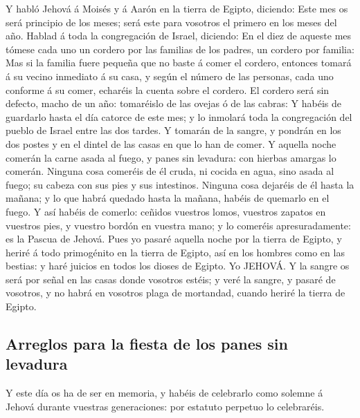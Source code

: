  Y habló Jehová á Moisés y á Aarón en la tierra de Egipto,
diciendo:  Este mes os será principio de los meses; será
este para vosotros el primero en los meses del año.  Hablad
á toda la congregación de Israel, diciendo: En el diez de aqueste mes
tómese cada uno un cordero por las familias de los padres, un cordero
por familia:  Mas si la familia fuere pequeña que no baste á
comer el cordero, entonces tomará á su vecino inmediato á su casa, y
según el número de las personas, cada uno conforme á su comer, echaréis
la cuenta sobre el cordero.  El cordero será sin defecto,
macho de un año: tomaréislo de las ovejas ó de las cabras: 
Y habéis de guardarlo hasta el día catorce de este mes; y lo inmolará
toda la congregación del pueblo de Israel entre las dos tardes.
 Y tomarán de la sangre, y pondrán en los dos postes y en el
dintel de las casas en que lo han de comer.  Y aquella noche
comerán la carne asada al fuego, y panes sin levadura: con hierbas
amargas lo comerán.  Ninguna cosa comeréis de él cruda, ni
cocida en agua, sino asada al fuego; su cabeza con sus pies y sus
intestinos.  Ninguna cosa dejaréis de él hasta la mañana; y
lo que habrá quedado hasta la mañana, habéis de quemarlo en el fuego.
 Y así habéis de comerlo: ceñidos vuestros lomos, vuestros
zapatos en vuestros pies, y vuestro bordón en vuestra mano; y lo
comeréis apresuradamente: es la Pascua de Jehová.  Pues yo
pasaré aquella noche por la tierra de Egipto, y heriré á todo
primogénito en la tierra de Egipto, así en los hombres como en las
bestias: y haré juicios en todos los dioses de Egipto. Yo JEHOVÁ.
 Y la sangre os será por señal en las casas donde vosotros
estéis; y veré la sangre, y pasaré de vosotros, y no habrá en vosotros
plaga de mortandad, cuando heriré la tierra de Egipto.

\hypertarget{arreglos-para-la-fiesta-de-los-panes-sin-levadura}{%
\subsection{Arreglos para la fiesta de los panes sin
levadura}\label{arreglos-para-la-fiesta-de-los-panes-sin-levadura}}

 Y este día os ha de ser en memoria, y habéis de celebrarlo
como solemne á Jehová durante vuestras generaciones: por estatuto
perpetuo lo celebraréis.

